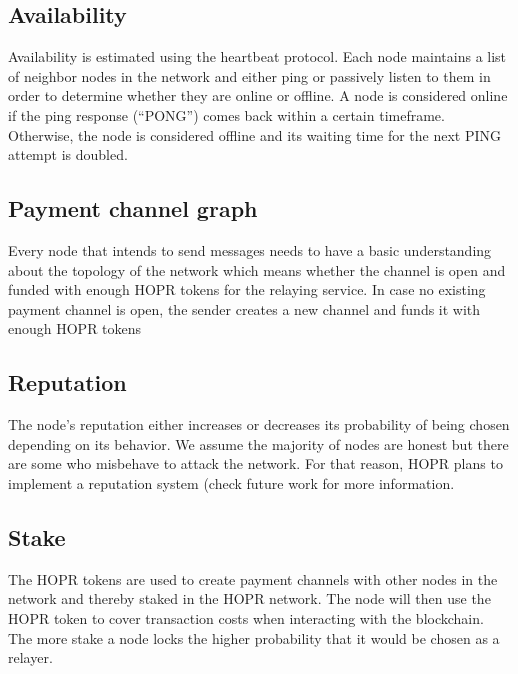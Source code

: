 \subsection{Availability}
Availability is estimated using the heartbeat protocol.
Each node maintains a list of neighbor nodes in the network and either ping or passively listen to them in order to determine whether they are online or offline.
A node is considered online if the ping response (“PONG”) comes back within a certain timeframe. Otherwise, the node is considered offline and its waiting time for the next PING attempt is doubled.


\subsection{Payment channel graph}
Every node that intends to send messages needs to have a basic understanding about the topology of the network which means whether the channel is open and funded with enough HOPR tokens for the relaying service. In case no existing payment channel is open, the sender creates a new channel and funds it with enough HOPR tokens

\subsection{Reputation}
The node’s reputation either increases or decreases its probability of being chosen depending on its behavior. We assume the majority of nodes are honest but there are some who misbehave to attack the network. For that reason, HOPR plans to implement a reputation system (check future work for more information.
\subsection{Stake}
The HOPR tokens are used to create payment channels with other nodes in the network and thereby staked in the HOPR network. The node will then use the HOPR token to cover transaction costs when interacting with the blockchain. The more stake a node locks the higher probability that it would be chosen as a relayer.
